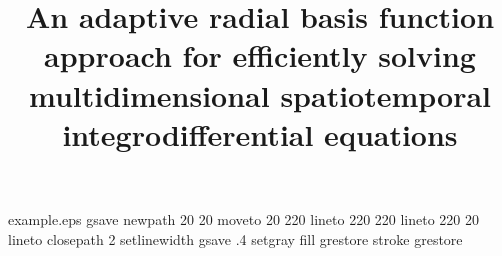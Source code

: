 %
%
%
%
%
\begin{filecontents*}{example.eps}
gsave
newpath
  20 20 moveto
  20 220 lineto
  220 220 lineto
  220 20 lineto
closepath
2 setlinewidth
gsave
  .4 setgray fill
grestore
stroke
grestore
\end{filecontents*}
%
\RequirePackage{fix-cm}
%
\documentclass[smallextended]{svjour3}       %
%
\smartqed  %
%
\usepackage{graphicx}
%
\usepackage{color}
\usepackage{amsmath, amsfonts, amssymb}
\usepackage{bm}
\usepackage{hyperref}   %
\usepackage{mathtools} %
\usepackage{algorithm}
\usepackage{algorithmic}
\usepackage{booktabs} 
\usepackage{comment}
\def\d{\mbox{d}}
%
%
%
%


\title{An adaptive radial basis function approach for efficiently solving multidimensional spatiotemporal integrodifferential equations%
}


